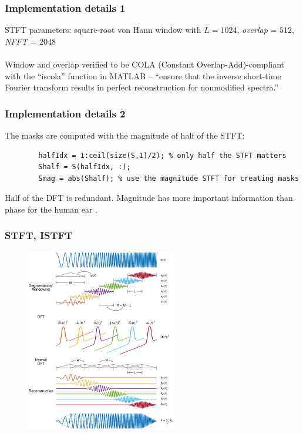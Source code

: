 \documentclass{beamer}
\begin{document}
\begin{frame}
	\frametitle{Implementation details 1}
	STFT parameters: square-root von Hann window with $L = 1024$, \textit{overlap} = $512$, \textit{NFFT} = $2048$\\\ \\
	Window and overlap verified to be COLA (Constant Overlap-Add)-compliant with the ``iscola'' function in MATLAB  -- ``ensure that the inverse short-time Fourier transform results in perfect reconstruction for nonmodified spectra.''
\end{frame}

\begin{frame}[fragile]
	\frametitle{Implementation details 2}
	The masks are computed with the magnitude of half of the STFT:
	\begin{small}
	\begin{verbatim}
	    halfIdx = 1:ceil(size(S,1)/2); % only half the STFT matters
	    Shalf = S(halfIdx, :);
	    Smag = abs(Shalf); % use the magnitude STFT for creating masks
	\end{verbatim}
	\end{small}
	Half of the DFT is redundant. Magnitude has more important information than phase for the human ear .
\end{frame}

\begin{frame}
	\frametitle{STFT, ISTFT}
	\begin{figure}
	\includegraphics[height=8cm]{../images/iscola0111.png}
	\end{figure}
\end{frame}
\end{document}
